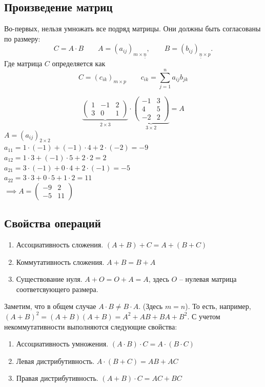 \documentclass[12pt, a4paper]{article}
\begin{document}
    \subsection{Произведение матриц}
    Во-первых, нельзя умножать все подряд матрицы. Они должны быть согласованы по размеру: \[
        C = A \cdot B \qquad A = (a_{ij})_{m\times \underline{\underline{n}}}, \qquad B = (b_{ij})_{\underline{\underline{n}}\times p}.
    \] Где матрица \( C \) определяется как \[
        C = (c_{ik})_{m\times p} \qquad c_{ik} = \sum_{j=1}^{n} a_{ij}b_{jk}
    \] 
    \begin{exmp}
        \[
            \underbrace{\begin{pmatrix} 1 & -1 & 2 \\3 & 0 & 1 \end{pmatrix}}_{2\times 3} \cdot \underbrace{\begin{pmatrix} -1& 3 \\ 4 & 5 \\ -2 & 2 \end{pmatrix}}_{3\times 2}  = A
        \] 
        \( A = (a_{ij}) _{2\times 2} \)\\
        \( a_{11} = 1 \cdot (-1) + (-1) \cdot 4 + 2 \cdot (-2) = -9 \)\\
        \( a_{12} = 1 \cdot 3 + (-1) \cdot 5 + 2 \cdot  2 = 2 \)\\
        \( a_{21} = 3 \cdot (-1) + 0 \cdot 4 + 2 \cdot (-1) = -5 \) \\
        \( a_{22} = 3 \cdot 3 + 0 \cdot 5 + 1 \cdot 2 = 11 \) \\
        \( \implies A = \begin{pmatrix} -9 & 2 \\ -5 & 11 \end{pmatrix}  \)
        
    \end{exmp}
    \subsection{Свойства операций}
    \begin{enumerate}
        \item Ассоциативность сложения. \( (A + B) + C = A + (B + C) \)
        \item Коммутативность сложения. \( A + B = B + A \)
        \item Существование нуля. \( A + O = O + A = A \), здесь \( O \) -- нулевая матрица соответсвующего размера.
    \end{enumerate}
    Заметим, что в общем случае \( A \cdot B \neq B \cdot A \). (Здесь \( m = n \)). То есть, например, \( (A + B)^2 = (A + B)(A + B) = A^2 + AB + BA + B^2 \).
    С учетом некоммутативности выполняются следующие свойства: 
    \begin{enumerate}
        \item Ассоциативность умножения. \( (A \cdot B) \cdot C = A \cdot (B \cdot C) \)
        \item Левая дистрибутивность. \( A \cdot (B + C) = AB + AC \)
        \item Правая дистрибутивность. \( (A + B) \cdot C = AC + BC \)
    \end{enumerate}
\end{document}
